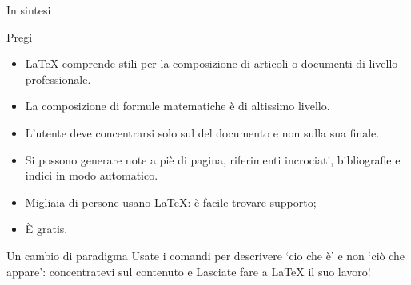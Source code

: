 \documentclass{beamer}
\begin{document}

\begin{frame}[fragile]{In sintesi}

\begin{block}{Pregi}
\begin{itemize}
	\item \LaTeX{} comprende stili per la composizione di articoli o documenti di livello professionale.
	\item La composizione di formule matematiche \`e di altissimo livello.
	\item L'utente deve concentrarsi solo sul  del documento e non sulla sua  finale.
	\item Si possono generare note a pi\`e di pagina, riferimenti incrociati,
	bibliografie e indici in modo automatico.
	\item Migliaia di persone usano \LaTeX: è facile trovare supporto;
	\item \`E gratis.
\end{itemize}
\end{block}


\begin{alertblock}{Un cambio di paradigma}
Usate i comandi per descrivere `cio che \`e' e non `ci\`o che appare': concentratevi sul contenuto e Lasciate fare a \LaTeX{} il suo lavoro!
\end{alertblock}
\end{frame}
\end{document}

